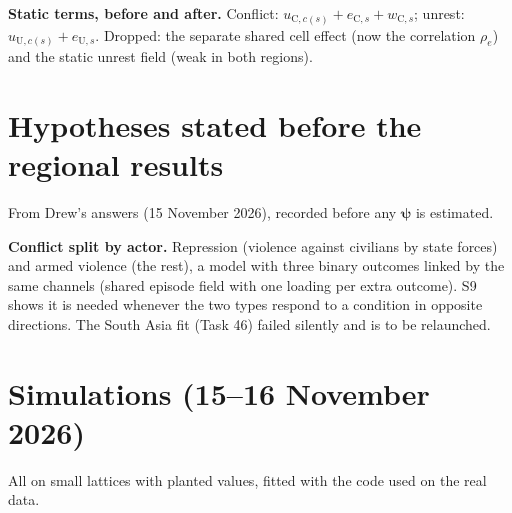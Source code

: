 \documentclass[10pt]{article}
\newcommand{\C}{\mathrm{C}}
\newcommand{\U}{\mathrm{U}}
\begin{document}
\textbf{Static terms, before and after.} Conflict: $u_{\C,c(s)} + e_{\C,s} + w_{\C,s}$; unrest:
$u_{\U,c(s)} + e_{\U,s}$. Dropped: the separate shared cell effect (now the correlation $\rho_e$) and
the static unrest field (weak in both regions).

\section*{Hypotheses stated before the regional results}
From Drew's answers (15 November 2026), recorded before any $\bm\psi$ is estimated.


\textbf{Conflict split by actor.} Repression (violence against civilians by state forces) and armed violence (the
rest), a model with three binary outcomes linked by the same channels (shared episode field with one loading per
extra outcome). S9 shows it is needed whenever the two types respond to a condition in opposite directions. The
South Asia fit (Task 46) failed silently and is to be relaunched.

\section*{Simulations (15--16 November 2026)}
All on small lattices with planted values, fitted with the code used on the real data.
\end{document}
